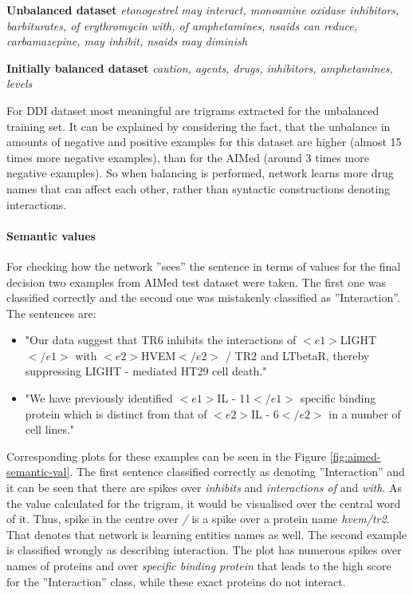 \textbf{Unbalanced dataset} \textit{etonogestrel may interact, monoamine oxidase inhibitors, barbiturates, of erythromycin with, of amphetamines, nsaids can reduce, carbamazepine, may inhibit, nsaids may diminish}

\textbf{Initially balanced dataset} \textit{caution, agents, drugs, inhibitors, amphetamines, levels}

For DDI dataset most meaningful are trigrams extracted for the unbalanced training set. It can be explained by considering the fact, that the unbalance in amounts of negative and positive examples for this dataset are higher (almost 15 times more negative examples), than for the AIMed (around 3 times more negative examples). So when balancing is performed, network learns more drug names that can affect each other, rather than syntactic constructions denoting interactions.

\paragraph{Semantic values} 
For checking how the network ''sees'' the sentence in terms of values for the final decision 
two examples from AIMed test dataset were taken. The first one was classified correctly and the 
second one was mistakenly classified as ''Interaction''. The sentences are:

\begin{itemize}
  \item "Our data suggest that TR6 inhibits the interactions of $<e1>$LIGHT$</e1>$ with $<e2>$HVEM$</e2>$ / TR2 and LTbetaR, thereby suppressing LIGHT - mediated HT29 cell death."
  \item "We have previously identified $<e1>$IL - 11$</e1>$ specific binding protein which is distinct from that of $<e2>$IL - 6$</e2>$ in a number of cell lines."
\end{itemize}

Corresponding plots for these examples can be seen in the Figure \ref{fig:aimed-semantic-val}. The 
first sentence classified correctly as denoting ''Interaction'' and it can be seen that there are  
spikes over \textit{inhibits} and \textit{interactions of} and \textit{with}. As the value calculated for the trigram, it would be visualised over the central word of it. Thus, spike in the centre over \textit{/} is a spike over a protein name \textit{hvem/tr2}. That denotes that network is learning entities names as well. The second example is classified wrongly as describing interaction. 
The plot has numerous spikes over names of proteins and over \textit{specific binding protein} that leads to the high score for the 
''Interaction'' class, while these exact proteins do not interact.

